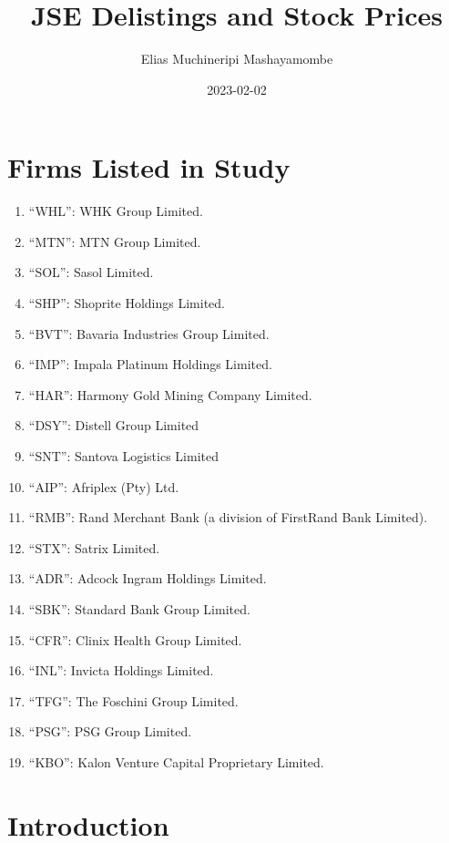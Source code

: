 \documentclass[
]{article}
\title{JSE Delistings and Stock Prices}
\author{Elias Muchineripi Mashayamombe}
\date{2023-02-02}
\providecommand{\tightlist}{%
  \setlength{\itemsep}{0pt}\setlength{\parskip}{0pt}}
\begin{document}
\maketitle

\newpage

\hypertarget{firms-listed-in-study}{%
\section{Firms Listed in Study}\label{firms-listed-in-study}}

\begin{enumerate}
\def\labelenumi{\arabic{enumi}.}
\tightlist
\item
  ``WHL'': WHK Group Limited.
\item
  ``MTN'': MTN Group Limited.
\item
  ``SOL'': Sasol Limited.
\item
  ``SHP'': Shoprite Holdings Limited.
\item
  ``BVT'': Bavaria Industries Group Limited.
\item
  ``IMP'': Impala Platinum Holdings Limited.
\item
  ``HAR'': Harmony Gold Mining Company Limited.
\item
  ``DSY'': Distell Group Limited
\item
  ``SNT'': Santova Logistics Limited
\item
  ``AIP'': Afriplex (Pty) Ltd.
\item
  ``RMB'': Rand Merchant Bank (a division of FirstRand Bank Limited).
\item
  ``STX'': Satrix Limited.
\item
  ``ADR'': Adcock Ingram Holdings Limited.
\item
  ``SBK'': Standard Bank Group Limited.
\item
  ``CFR'': Clinix Health Group Limited.
\item
  ``INL'': Invicta Holdings Limited.
\item
  ``TFG'': The Foschini Group Limited.
\item
  ``PSG'': PSG Group Limited.
\item
  ``KBO'': Kalon Venture Capital Proprietary Limited.
\end{enumerate}

\newpage

\hypertarget{introduction}{%
\section{Introduction}\label{introduction}}
\end{document}
